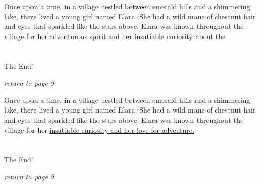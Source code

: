 \documentclass{memoir}
\begin{document}
        


        \hspace{1cm}\vfill
        \begin{minipage}{3in}
        \LARGE
        Once upon a time, in a village nestled between emerald hills and a shimmering lake, there lived a young girl named Elara. She had a wild mane of chestnut hair and eyes that sparkled like the stars above. Elara was known throughout the village for her \ul{adventurous spirit and her insatiable curiosity about the}\\ \vspace{5mm} \\
 \\\vspace{1cm} The End! \\ 

        \hspace{1cm}\begin{minipage}{6cm}
        \normalsize
            \hfill \textit{return to page 9}
        \end{minipage} 
        \end{minipage}
        \hspace{1cm}\vfill
        \cleardoublepage

        


        \hspace{1cm}\vfill
        \begin{minipage}{3in}
        \LARGE
        Once upon a time, in a village nestled between emerald hills and a shimmering lake, there lived a young girl named Elara. She had a wild mane of chestnut hair and eyes that sparkled like the stars above. Elara was known throughout the village for her \ul{insatiable curiosity and her love for adventure.}\\ \vspace{5mm} \\
 \\\vspace{1cm} The End! \\ 

        \hspace{1cm}\begin{minipage}{6cm}
        \normalsize
            \hfill \textit{return to page 9}
        \end{minipage} 
        \end{minipage}
        \hspace{1cm}\vfill
        \cleardoublepage

        
\end{document}
